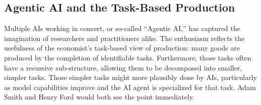 \documentclass{article}
\theoremstyle{plain}
\theoremstyle{plain}
\begin{document}


\subsection{Agentic AI and the Task-Based Production}
Multiple AIs working in concert, or so-called ``Agentic AI,'' has captured the imagination of researchers and practitioners alike.
The enthusiasm reflects the usefulness of the economist's task-based view of production: many goods are produced by the completion of identifiable tasks.
Furthermore, those tasks often have a recursive sub-structure, allowing them to be decomposed into smaller, simpler tasks.
Those simpler tasks might more plausibly done by AIs, particularly as model capabilities improve and the AI agent is specialized for that task. 
Adam Smith and Henry Ford would both see the point immediately. 
\end{document}
